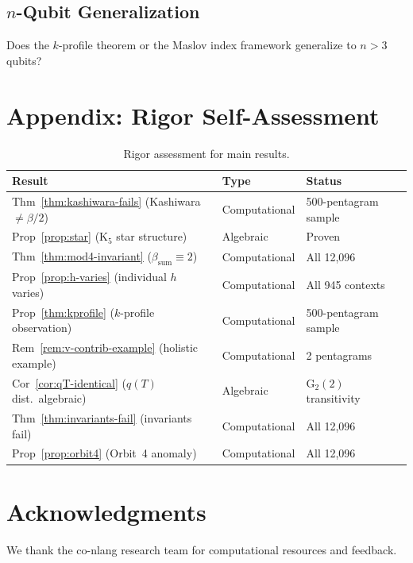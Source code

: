 \documentclass[11pt,a4paper]{article}
\theoremstyle{remark}
\begin{document}
\subsection{\texorpdfstring{$n$-Qubit Generalization}{n-Qubit Generalization}}

Does the $k$-profile theorem or the Maslov index framework generalize to $n > 3$ qubits?



\section*{Appendix: Rigor Self-Assessment}

\begin{table}[H]
\centering
\begin{tabular}{lll}
\toprule
\textbf{Result} & \textbf{Type} & \textbf{Status} \\
\midrule
Thm~\ref{thm:kashiwara-fails} (Kashiwara $\neq \beta/2$) & Computational & 500-pentagram sample \\
Prop~\ref{prop:star} (K$_5$ star structure) & Algebraic & Proven \\
Thm~\ref{thm:mod4-invariant} ($\beta_{\mathrm{sum}} \equiv 2$) & Computational & All 12{,}096~\cite{PaperXIsuppl} \\
Prop~\ref{prop:h-varies} (individual $h$ varies) & Computational & All 945 contexts \\
Prop~\ref{thm:kprofile} ($k$-profile observation) & Computational & 500-pentagram sample \\
Rem~\ref{rem:v-contrib-example} (holistic example) & Computational & 2 pentagrams \\
Cor~\ref{cor:qT-identical} ($q(T)$ dist.\ algebraic) & Algebraic & G$_2(2)$ transitivity \\
Thm~\ref{thm:invariants-fail} (invariants fail) & Computational & All 12{,}096 \\
Prop~\ref{prop:orbit4} (Orbit~4 anomaly) & Computational & All 12{,}096 \\
\bottomrule
\end{tabular}
\caption{Rigor assessment for main results.}
\end{table}

\section*{Acknowledgments}

We thank the co-nlang research team for computational resources and feedback.
\end{document}
